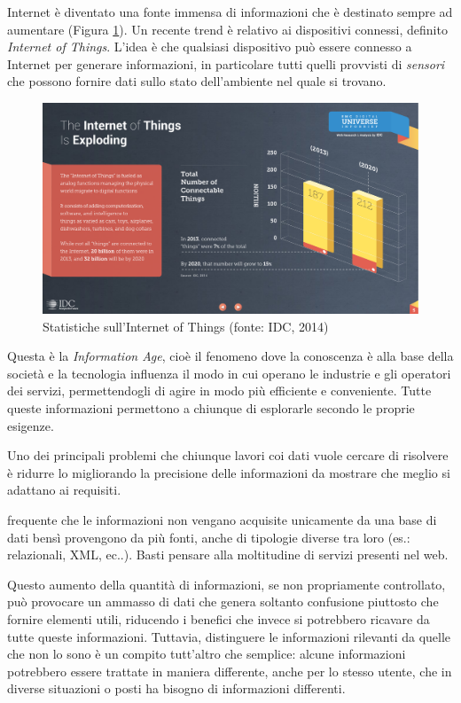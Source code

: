 Internet è diventato una fonte immensa di informazioni che è destinato sempre ad aumentare (Figura \ref{fig:statistiche-iot}). Un recente trend è relativo ai dispositivi connessi, definito \emph{Internet of Things}. L'idea è che qualsiasi dispositivo può essere connesso a Internet per generare informazioni, in particolare tutti quelli provvisti di \emph{sensori} che possono fornire dati sullo stato dell'ambiente nel quale si trovano.

\begin{figure}[ht]
	\centering
	\includegraphics[width=\textwidth]{1-introduzione/Immagini/iot-trend.pdf}
	\caption[Statistiche sull'Internet of Things]{Statistiche sull'Internet of Things (fonte: IDC, 2014)\label{fig:statistiche-iot}}
\end{figure}

Questa è la \emph{Information Age}, cioè il fenomeno dove la conoscenza è alla base della società e la tecnologia influenza il modo in cui operano le industrie e gli operatori dei servizi, permettendogli di agire in modo più efficiente e conveniente. Tutte queste informazioni permettono a chiunque di esplorarle secondo le proprie esigenze. 

Uno dei principali problemi che chiunque lavori coi dati vuole cercare di risolvere è ridurre lo  migliorando la precisione delle informazioni da mostrare che meglio si adattano ai requisiti.

\upe frequente che le informazioni non vengano acquisite unicamente da una base di dati bensì provengono da più fonti, anche di tipologie diverse tra loro (es.: relazionali, XML, ec..). Basti pensare alla moltitudine di servizi presenti nel web.

Questo aumento della quantità di informazioni, se non propriamente controllato, può provocare un ammasso di dati che genera soltanto confusione piuttosto che fornire elementi utili, riducendo i benefici che invece si potrebbero ricavare da tutte queste informazioni. Tuttavia, distinguere le informazioni rilevanti da quelle che non lo sono è un compito tutt'altro che semplice: alcune informazioni potrebbero essere trattate in maniera differente, anche per lo stesso utente, che in diverse situazioni o posti ha bisogno di informazioni differenti. 

